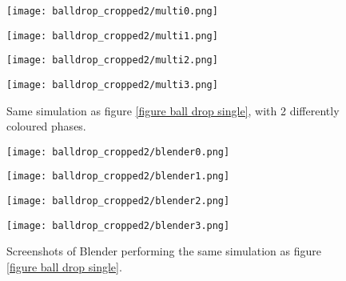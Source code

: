 \begin{figure}[H]
    \centering
    
    \begin{minipage}[t]{6.2cm}
        \centering
        \vspace{0pt}
        \texttt{[image: balldrop\_cropped2/multi0.png]}
    \end{minipage}
    \begin{minipage}[t]{6.2cm}
        \centering
        \vspace{0pt}
        \texttt{[image: balldrop\_cropped2/multi1.png]}
    \end{minipage}

    \vspace{0.5cm}

    \begin{minipage}[t]{6.2cm}
        \centering
        \vspace{0pt}
        \texttt{[image: balldrop\_cropped2/multi2.png]}
    \end{minipage}
    \begin{minipage}[t]{6.2cm}
        \centering
        \vspace{0pt}
        \texttt{[image: balldrop\_cropped2/multi3.png]}
    \end{minipage}

    \caption{Same simulation as figure \ref{figure ball drop single}, with 2 differently coloured phases.}
    \label{figure ball drop multi}
\end{figure}



\begin{figure}[H]
    \centering
    
    \begin{minipage}[t]{6.2cm}
        \centering
        \vspace{0pt}
        \texttt{[image: balldrop\_cropped2/blender0.png]}
    \end{minipage}
    \begin{minipage}[t]{6.2cm}
        \centering
        \vspace{0pt}
        \texttt{[image: balldrop\_cropped2/blender1.png]}
    \end{minipage}

    \vspace{0.5cm}

    \begin{minipage}[t]{6.2cm}
        \centering
        \vspace{0pt}
        \texttt{[image: balldrop\_cropped2/blender2.png]}
    \end{minipage}
    \begin{minipage}[t]{6.2cm}
        \centering
        \vspace{0pt}
        \texttt{[image: balldrop\_cropped2/blender3.png]}
    \end{minipage}

    \caption{Screenshots of Blender performing the same simulation as figure \ref{figure ball drop single}.}
    \label{figure ball drop blender}
\end{figure}


